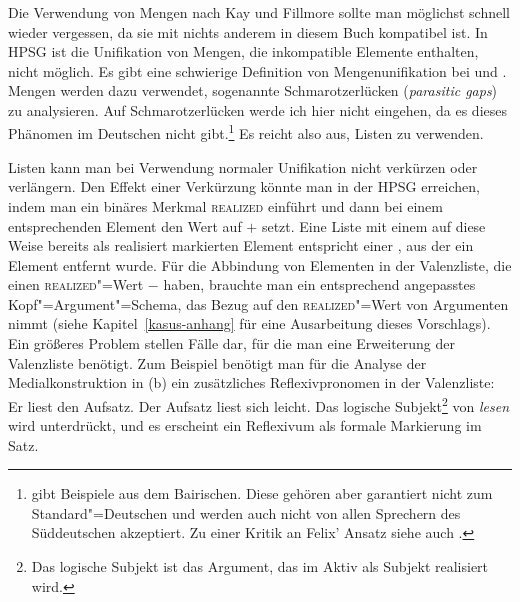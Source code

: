 \subsubsection{}
\label{sec-vererbung-koenig}

Die Verwendung von Mengen nach Kay und Fillmore sollte man möglichst schnell wieder vergessen,
da sie mit nichts anderem in diesem Buch kompatibel ist. In HPSG ist die Unifikation von Mengen,
die inkompatible Elemente enthalten, nicht möglich. Es gibt eine schwierige Definition von Mengenunifikation
bei \citet[--49]{ps} und \citet{PM90a}. Mengen werden dazu verwendet, sogenannte Schmarotzerlücken (\emph{parasitic gaps})
zu analysieren. Auf Schmarotzerlücken werde ich hier nicht eingehen, da es dieses Phänomen im Deutschen
nicht gibt.\footnote{
        \citet*{Felix85} gibt Beispiele aus dem Bairischen. 
        Diese gehören aber garantiert nicht zum Standard"=Deutschen und
        werden auch nicht von allen Sprechern des Süddeutschen akzeptiert. 
        Zu einer Kritik an Felix' Ansatz siehe auch 
        \citet*[]{Oppenrieder91a}.
}
Es reicht also aus, Listen zu verwenden.

Listen kann man bei Verwendung normaler Unifikation nicht verkürzen oder verlängern.
Den Effekt
einer Verkürzung könnte man in der HPSG erreichen, indem man ein binäres Merkmal \textsc{realized}
einführt und dann bei einem entsprechenden Element den Wert auf $+$ setzt. 
Eine Liste mit einem auf diese Weise bereits als realisiert markierten Element entspricht
einer \compsl, aus der ein Element entfernt wurde. Für die Abbindung von Elementen
in der Valenzliste, die einen \textsc{realized}"=Wert $-$ haben, brauchte man ein entsprechend
angepasstes Kopf"=Argument"=Schema, das Bezug auf den \textsc{realized}"=Wert von Argumenten nimmt
(siehe Kapitel~\ref{kasus-anhang} für eine Ausarbeitung dieses Vorschlags).
Ein größeres Problem stellen Fälle dar, für die man eine Erweiterung der Valenzliste
benötigt. Zum Beispiel benötigt man für die Analyse der Medialkonstruktion in (b)
ein zusätzliches Reflexivpronomen in der Valenzliste:
\eal
\ex Er          liest den Aufsatz.
\ex Der Aufsatz liest sich leicht.
\zl
Das logische Subjekt\footnote{
  Das logische Subjekt ist das Argument, das im Aktiv als Subjekt realisiert wird.%
}
von \emph{lesen} wird unterdrückt, und es erscheint ein Reflexivum als
formale Markierung im Satz.

